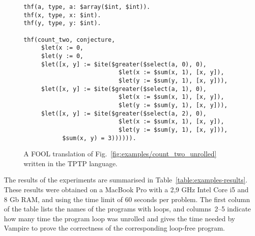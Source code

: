 
\begin{figure}[tb]
  \centering
  \begin{minipage}[t]{\textwidth}
    \begin{lstlisting}
thf(a, type, a: $array($int, $int)).
thf(x, type, x: $int).
thf(y, type, y: $int).

thf(count_two, conjecture,
     $let(x := 0,
     $let(y := 0,
     $let([x, y] := $ite($greater($select(a, 0), 0),
                           $let(x := $sum(x, 1), [x, y]),
                           $let(y := $sum(y, 1), [x, y])),
     $let([x, y] := $ite($greater($select(a, 1), 0),
                           $let(x := $sum(x, 1), [x, y]),
                           $let(y := $sum(y, 1), [x, y])),
     $let([x, y] := $ite($greater($select(a, 2), 0),
                           $let(x := $sum(x, 1), [x, y]),
                           $let(y := $sum(y, 1), [x, y])),
           $sum(x, y) = 3)))))).
    \end{lstlisting}
  \end{minipage}
  \caption{A FOOL translation of Fig.~\ref{fig:examples/count_two_unrolled} written in the TPTP language.}
  \label{fig:examples/count_two_tptp}
\end{figure}

The results of the experiments are summarised in Table~\ref{table:examples-results}. These results were obtained on a MacBook Pro with a 2,9 GHz Intel Core i5 and 8 Gb RAM, and using the time limit of 60 seconds per problem.  The first column of the table lists the
names of the programs with loops, and columns~2--5 indicate how many
time the program loop was unrolled and gives the time needed by
Vampire to prove the correctness of the corresponding loop-free
program. %


